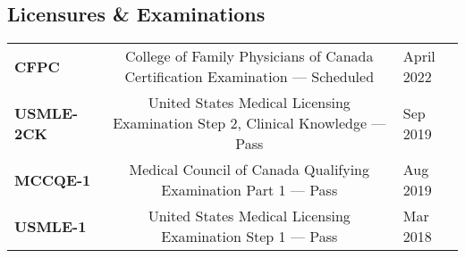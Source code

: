 \documentclass[a4paper,10pt,oneside,onecolumn,draft]{article} %
\begin{document}
\subsection*{Licensures \& Examinations}
\begin{supertabular*}{1\textwidth}{a@{\SubVRule}C@{\VRule}z}
  {\bfseries CFPC}&{College of Family Physicians of Canada Certification Examination --- Scheduled}&April 2022\\
  {\bfseries USMLE-2CK}&{United States Medical Licensing Examination Step 2, Clinical Knowledge --- Pass}&Sep 2019\\
  {\bfseries MCCQE-1}&{Medical Council of Canada Qualifying Examination Part 1 --- Pass}&Aug 2019\\
  {\bfseries USMLE-1}&{United States Medical Licensing Examination Step 1 --- Pass}&Mar 2018\\
\end{supertabular*}

\end{document}
